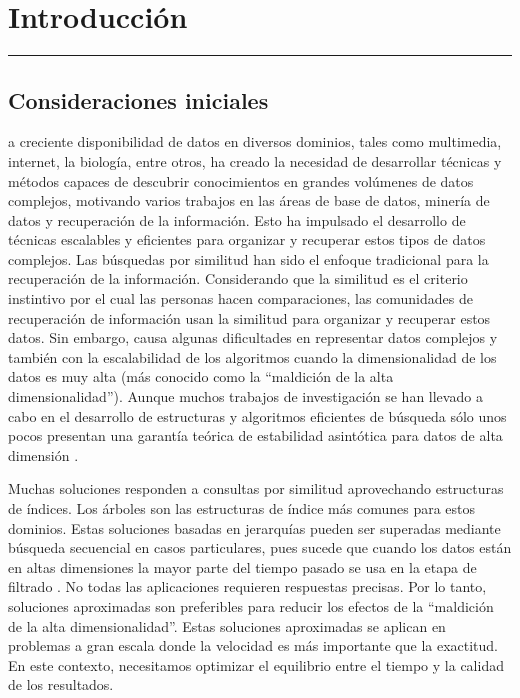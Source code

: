 \setcounter{equation}{0}
\chapter{Introducción}
\hrule \bigskip \vspace*{1cm}

\section{Consideraciones iniciales}

a creciente disponibilidad de datos en diversos dominios, tales  como multimedia, internet, la biología, entre  otros,  ha creado  la necesidad  de desarrollar  técnicas y métodos capaces de descubrir  conocimientos  en grandes volúmenes de datos complejos, motivando  varios  trabajos en las áreas  de base  de datos,  minería de datos  y recuperación  de la información. Esto ha impulsado el desarrollo de técnicas escalables y eficientes para organizar y recuperar estos tipos de datos complejos. Las búsquedas por similitud han sido el enfoque tradicional para la recuperación de la información. Considerando que la similitud es el criterio instintivo por el cual las personas hacen comparaciones, las comunidades de recuperación de información usan la similitud para organizar y recuperar estos datos.    Sin embargo, causa algunas dificultades en representar datos complejos y también con la escalabilidad de los algoritmos cuando la dimensionalidad de los datos es muy alta (más conocido como la ``maldición de la alta dimensionalidad''). Aunque muchos trabajos de investigación se han llevado a cabo en el desarrollo de estructuras y algoritmos eficientes de búsqueda sólo unos pocos presentan una garantía teórica de estabilidad asintótica para datos de alta dimensión \cite{5459466,CiteULike:7399806}.

Muchas soluciones responden a consultas por similitud aprovechando estructuras de índices. Los árboles son las estructuras de índice más comunes para estos dominios. Estas soluciones basadas en jerarquías pueden ser superadas mediante búsqueda secuencial en casos particulares, pues sucede que cuando los datos están en altas  dimensiones  la mayor parte del tiempo pasado se usa en la etapa de filtrado  \cite{WhatsWrong}. No todas las aplicaciones requieren respuestas precisas. Por lo tanto,  soluciones aproximadas son preferibles para reducir los efectos de la ``maldición de la alta dimensionalidad''. Estas soluciones aproximadas se aplican en problemas a gran escala donde la velocidad es más importante que la exactitud. En este contexto, necesitamos optimizar el equilibrio entre el tiempo y la calidad de los resultados.

